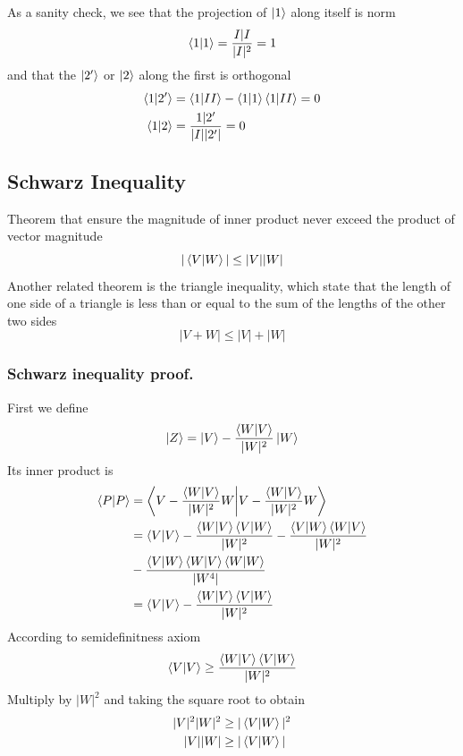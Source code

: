 \documentclass[../../../main.tex]{subfiles}
\begin{document}
As a sanity check, we see that the projection of $\ket{1}$ along itself is norm
\begin{equation*}
	\braket{1|1}=\frac{I|I }{|I|^2}=1
\end{equation*}
and that the $\ket{2'}$ or $\ket{2}$ along the first is orthogonal
\begin{align*}
	\braket{1|2'} & =\braket{1|II}-\braket{1|1}\braket{1|II}=0 \\
	\braket{1|2}  & =\frac{1|2'}{|I||2'|}=0
\end{align*}

\subsection{Schwarz Inequality}
Theorem that ensure the magnitude of inner product never exceed the product of vector magnitude
\begin{equation*}
	|\braket{V|W}|\leq|V||W|
\end{equation*}
Another related theorem is the triangle inequality, which state that the length of one side of a triangle is less than or equal to the sum of the lengths of the other two sides
\begin{equation*}
	|V+W|\leq|V|+|W|
\end{equation*}

\subsubsection{Schwarz inequality proof.}
First we define
\begin{equation*}
	\ket{Z}=\ket{V}-\frac{\braket{W|V }}{|W|^2}\ket{W}
\end{equation*}
Its inner product is
\begin{align*}
	\braket{P|P} & =\bigg\langle V-\frac{\braket{W|V }}{|W|^2} W\bigg|V-\frac{\braket{W|V }}{|W|^2}W\bigg\rangle    \\
	             & =\braket{V|V} -\frac{\braket{W|V }\braket{V|W }}{|W|^2}-\frac{\braket{V|W }\braket{W|V }}{|W|^2} \\
	             & -\frac{\braket{V|W }\braket{W|V }\braket{W|W}}{|W^4|}                                            \\
	             & =\braket{V|V}-\frac{\braket{W|V }\braket{V|W }}{|W|^2}
\end{align*}
According to semidefinitness axiom
\begin{equation*}
	\braket{V|V}\geq \frac{\braket{W|V }\braket{ V|W}}{|W|^2}
\end{equation*}
Multiply by $|W|^2$ and taking the square root to obtain
\begin{align*}
	|V|^2|W|^2 & \geq|\braket{V|W}|^2 \\
	|V||W|     & \geq|\braket{V|W}|
\end{align*}
\end{document}
